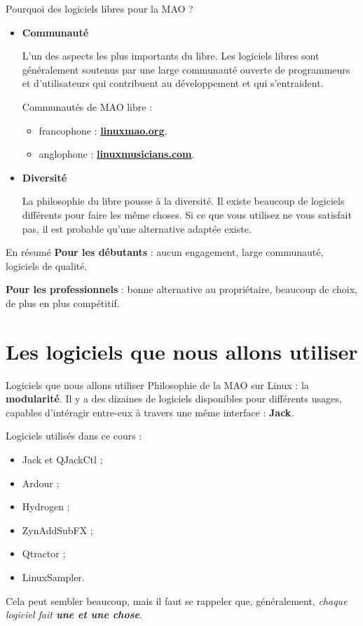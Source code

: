 \documentclass{beamer}
\begin{document}
\begin{frame}{Pourquoi des logiciels libres pour la MAO ?}
  \begin{itemize}
  \item \textbf{Communauté}
  
    L'un des aspects les plus importants du libre. Les logiciels libres sont généralement soutenus par une large communauté ouverte de programmeurs et d'utilisateurs qui contribuent au développement et qui s'entraident.
    
    Communautés de MAO libre :
    \begin{itemize}
    \item francophone : \textbf{\url{linuxmao.org}},
    \item anglophone : \textbf{\url{linuxmusicians.com}}.
    \end{itemize}
    
  \item \textbf{Diversité}
    
    La philosophie du libre pousse à la diversité. Il existe beaucoup de logiciels différents pour faire les même choses. Si ce que vous utilisez ne vous satisfait pas, il est probable qu'une alternative adaptée existe.
  \end{itemize}
\end{frame}

\begin{frame}{En résumé}
  \textbf{Pour les débutants} : aucun engagement, large communauté, logiciels de qualité.
  \medskip
  
  \textbf{Pour les professionnels} : bonne alternative au propriétaire, beaucoup de choix, de plus en plus compétitif.
\end{frame}



\section{Les logiciels que nous allons utiliser}
\begin{frame}{Logiciels que nous allons utiliser}
  Philosophie de la MAO sur Linux : la \textbf{modularité}. Il y a des dizaines de logiciels disponibles pour différents usages, capables d'intéragir entre-eux à travers une même interface : \textbf{Jack}.
  \medskip
  
  Logiciels utilisés dans ce cours :
  \begin{itemize}
  \item Jack et QJackCtl ;
  \item Ardour ;
  \item Hydrogen ;
  \item ZynAddSubFX ;
  \item Qtractor ;
  \item LinuxSampler.
  \end{itemize}
  
  Cela peut sembler beaucoup, mais il faut se rappeler que, généralement, \emph{chaque logiciel fait \textbf{une et une chose}}.
\end{frame}
\end{document}
